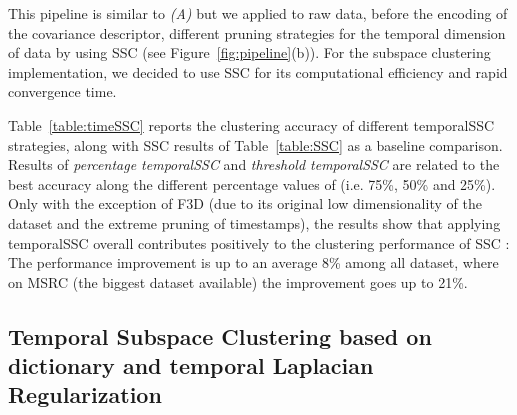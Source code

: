 \documentclass[10pt,a4paper,conference]{IEEEtran}
\begin{document}
This pipeline is similar to \emph{(A)} but we applied to raw data, before the encoding of the covariance descriptor, different pruning strategies for the temporal dimension of data by using SSC (see Figure~\ref{fig:pipeline}(b)). For the subspace clustering implementation, we decided to use SSC for its computational efficiency and rapid convergence time.

Table~\ref{table:timeSSC} reports the clustering accuracy of different temporalSSC strategies, along with SSC results of Table~\ref{table:SSC} \cite{elhamifar2013sparse} as a baseline comparison.
Results of \emph{percentage temporalSSC} and \emph{threshold temporalSSC} are related to the best accuracy along the different percentage values of  (i.e. 75\%, 50\% and 25\%).
Only with the exception of F3D (due to its original low dimensionality of the dataset and the extreme pruning of timestamps), the results show that applying temporalSSC overall contributes positively to the clustering performance of SSC \cite{elhamifar2013sparse}: The performance improvement is up to an average 8\% among all dataset, where on MSRC (the biggest dataset available) the improvement goes up to 21\%.





\subsection{Temporal Subspace Clustering based on dictionary and temporal Laplacian Regularization}\label{sec:res_TSC}
\end{document}
